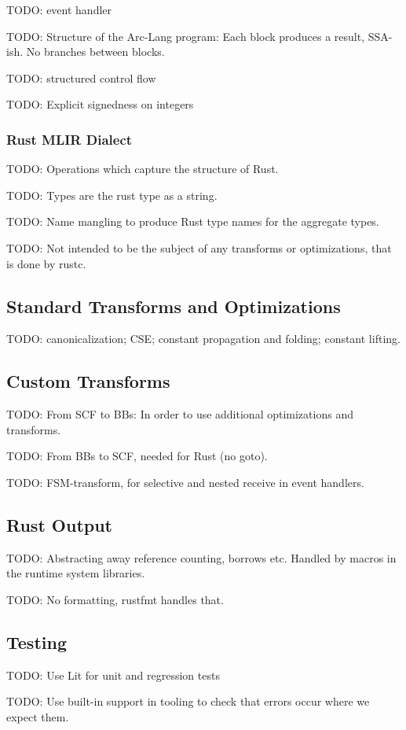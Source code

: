 TODO: event handler

TODO: Structure of the Arc-Lang program: Each block produces a result, SSA-ish. No branches between blocks.

TODO: structured control flow

TODO: Explicit signedness on integers

\subsubsection{Rust MLIR Dialect}

TODO: Operations which capture the structure of Rust.

TODO: Types are the rust type as a string.

TODO: Name mangling to produce Rust type names for the aggregate types.

TODO: Not intended to be the subject of any transforms or optimizations, that is done by rustc.

\subsection{Standard Transforms and Optimizations}

TODO: canonicalization; CSE; constant propagation and folding; constant lifting.

\subsection{Custom Transforms}

TODO: From SCF to BBs: In order to use additional optimizations and
transforms.

TODO: From BBs to SCF, needed for Rust (no goto).

TODO: FSM-transform, for selective and nested receive in event handlers.

\subsection{Rust Output}

TODO: Abstracting away reference counting, borrows etc. Handled by macros in the runtime system libraries.

TODO: No formatting, rustfmt handles that.

\subsection{Testing}

TODO: Use Lit for unit and regression tests

TODO: Use built-in support in tooling to check that errors occur where we expect them.
